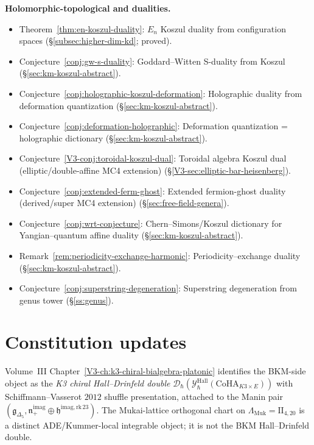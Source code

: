 \smallskip
\noindent\textbf{Holomorphic-topological and dualities.}
\begin{itemize}[nosep]
\item Theorem~\ref{thm:en-koszul-duality}:
 $E_n$ Koszul duality from configuration spaces
 (\S\ref{subsec:higher-dim-kd}; proved).

\item Conjecture~\ref{conj:gw-s-duality}:
 Goddard--Witten S-duality from Koszul
 (\S\ref{sec:km-koszul-abstract}).

\item Conjecture~\ref{conj:holographic-koszul-deformation}:
 Holographic duality from deformation quantization
 (\S\ref{sec:km-koszul-abstract}).

\item Conjecture~\ref{conj:deformation-holographic}:
 Deformation quantization = holographic dictionary
 (\S\ref{sec:km-koszul-abstract}).

\item Conjecture~\ref{V3-conj:toroidal-koszul-dual}:
 Toroidal algebra Koszul dual \textup{(}elliptic/double-affine MC4 extension\textup{)}
 (\S\ref{V3-sec:elliptic-bar-heisenberg}).
\item Conjecture~\ref{conj:extended-ferm-ghost}:
 Extended fermion-ghost duality \textup{(}derived/super MC4 extension\textup{)}
 (\S\ref{sec:free-field-genera}).
\item Conjecture~\ref{conj:wrt-conjecture}:
 Chern--Simons/Koszul dictionary for Yangian--quantum affine duality
 (\S\ref{sec:km-koszul-abstract}).
\item Remark~\ref{rem:periodicity-exchange-harmonic}:
 Periodicity--exchange duality
 (\S\ref{sec:km-koszul-abstract}).
\item Conjecture~\ref{conj:superstring-degeneration}:
 Superstring degeneration from genus tower
 (\S\ref{ss:genus}).
\end{itemize}

\section{Constitution updates}
\label{sec:const-supplement}

\begin{remark}
\label{rem:const-hall-drinfeld-naming}
Volume~III Chapter~\ref{V3-ch:k3-chiral-bialgebra-platonic} identifies
the BKM-side object as the
\emph{K3 chiral Hall--Drinfeld double}
$\mathcal{D}_\hbar(\mathcal{Y}^{\mathrm{Hall}}_\hbar(\mathrm{CoHA}_{K3 \times E}))$ with
Schiffmann--Vasserot $2012$ shuffle presentation, attached to the Manin pair
$(\mathfrak{g}_{\Delta_5}, \mathfrak{n}_+^{\mathrm{imag}} \oplus \mathfrak{h}^{\mathrm{imag,rk\,23}})$.
The Mukai-lattice orthogonal chart on
$\Lambda_{\mathrm{Muk}} = \mathrm{II}_{4,20}$ is a distinct
ADE/Kummer-local integrable object; it is not the BKM
Hall--Drinfeld double.
\end{remark}

